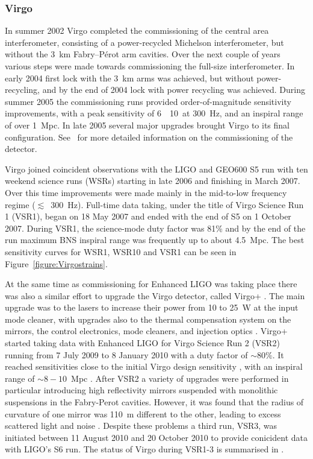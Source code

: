 \subsubsection{Virgo}

In summer 2002 Virgo completed the commissioning of the central area interferometer, consisting of a 
power-recycled Michelson interferometer, but without the 3~km Fabry--P\'{e}rot arm cavities. Over the next 
couple of years various steps were made towards commissioning the full-size interferometer. In early 2004 
first lock with the 3~km arms was achieved, but without power-recycling, and by the end of 2004 lock with 
power recycling was achieved. During summer 2005 the commissioning runs provided order-of-magnitude
sensitivity improvements, with a peak sensitivity of 6~\texttimes~10~\Hz at 300~Hz, and an 
inspiral range of over 1~Mpc. In late 2005 several major upgrades brought Virgo to its final configuration. 
See~\cite{Acernese:2004, Acernese:2005, Acernese:2006, Acernese:2007} for more detailed information on the
commissioning of the detector.

Virgo joined coincident observations with the LIGO and GEO600 S5 run with ten weekend science runs (WSRs) 
starting in late 2006 and finishing in March 2007. Over this time improvements were made mainly in the 
mid-to-low frequency regime ($\lesssim$~300~Hz). Full-time data taking, under the title of Virgo Science Run 
1 (VSR1), began on 18 May 2007 and ended with the end of S5 on 1 October 2007. During VSR1, the science-mode 
duty factor was 81\% and by the end of the run maximum BNS inspiral range was frequently up to about 4.5~Mpc. 
The best sensitivity curves for WSR1, WSR10 and VSR1 can be seen in Figure~\ref{figure:Virgostrains}.

At the same time as commissioning for Enhanced LIGO was taking place there was also a similar effort to 
upgrade the Virgo detector, called Virgo+ \cite{2011CQGra..28k4002A}. The main upgrade was to the lasers to 
increase their power from 10 to 25~W at the input mode cleaner, with upgrades also to the thermal compensation 
system on the mirrors, the control electronics, mode cleaners, and injection optics \cite{Acernese:2008b, 
AdvVirgoWhitepaper}. Virgo+ started taking data with Enhanced LIGO for Virgo Science Run 2 (VSR2) running from 
7 July 2009 to 8 January 2010 with a duty factor of $\sim 80\%$. It reached sensitivities close to the initial 
Virgo design sensitivity \cite{2012JInst...7.3012A}, with an inspiral range of $\sim 8-10$~Mpc 
\cite{VSR2paper}. After VSR2 a variety of upgrades were performed in particular introducing high reflectivity 
mirrors suspended with monolithic suspensions in the Fabry-Perot cavities. However, it was found that the 
radius of curvature of one mirror was 110~m different to the other, leading to excess scattered light and 
noise \cite{VSR2paper}. Despite these problems a third run, VSR3, was initiated between 11 August 2010 
and 20 October 2010 to provide conicident data with LIGO's S6 run. The status of Virgo during VSR1-3 is 
summarised in \cite{2012CQGra..29o5002A}.

